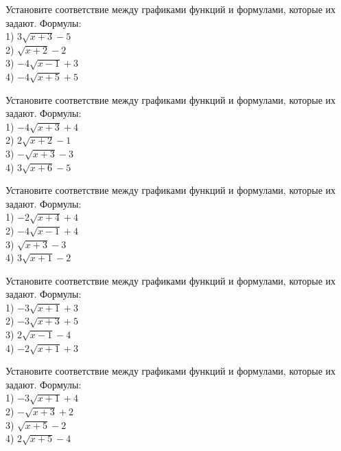 \documentclass[4apaper]{article}
\begin{document}
\begin{taskBN}{6}
Установите соответствие между графиками функций и формулами, которые их задают. Формулы: \\1) $3\sqrt{x+3}-5$\\2) $\sqrt{x+2}-2$\\3) $-4\sqrt{x-1}+3$\\4) $-4\sqrt{x+5}+5$
\end{taskBN}

\begin{taskBN}{7}
Установите соответствие между графиками функций и формулами, которые их задают. Формулы: \\1) $-4\sqrt{x+3}+4$\\2) $2\sqrt{x+2}-1$\\3) $-\sqrt{x+3}-3$\\4) $3\sqrt{x+6}-5$
\end{taskBN}

\begin{taskBN}{8}
Установите соответствие между графиками функций и формулами, которые их задают. Формулы: \\1) $-2\sqrt{x+4}+4$\\2) $-4\sqrt{x-1}+4$\\3) $\sqrt{x+3}-3$\\4) $3\sqrt{x+1}-2$
\end{taskBN}

\begin{taskBN}{9}
Установите соответствие между графиками функций и формулами, которые их задают. Формулы: \\1) $-3\sqrt{x+1}+3$\\2) $-3\sqrt{x+3}+5$\\3) $2\sqrt{x-1}-4$\\4) $-2\sqrt{x+1}+3$
\end{taskBN}

\begin{taskBN}{10}
Установите соответствие между графиками функций и формулами, которые их задают. Формулы: \\1) $-3\sqrt{x+1}+4$\\2) $-\sqrt{x+3}+2$\\3) $\sqrt{x+5}-2$\\4) $2\sqrt{x+5}-4$
\end{taskBN}
\end{document}
